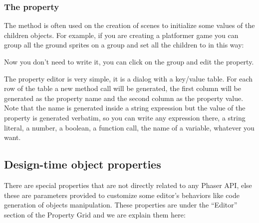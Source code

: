 \documentclass[letterpaper,10pt,english]{sphinxmanual}
\begin{document}
\subsubsection{The  property}
\label{\detokenize{canvas:the-setall-property}}
The  method is often used on the creation of scenes to initialize some values of the children objects. For example, if you are creating a platformer game you can group all the ground sprites on a group and set all the children to  in this way:

\begin{sphinxVerbatim}[commandchars=\\\{\}]
 
\end{sphinxVerbatim}

Now you don’t need to write it, you can click on the  group and edit the  property.

The  property editor is very simple, it is a dialog with a key/value table. For each row of the table a new  method call will be generated, the first column will be generated as the property name and the second column as the property value. Note that the name is generated inside a string expression  but the value of the property is generated verbatim, so you can write any expression there, a string literal, a number, a boolean, a function call, the name of a variable, whatever you want.

\noindent{}


\subsection{Design-time object properties}
\label{\detokenize{canvas:design-time-object-properties}}
There are special properties that are not directly related to any Phaser API, else these are parameters provided to customize some editor’s behaviors like code generation of objects manipulation. These properties are under the “Editor” section of the Property Grid and we are explain them here:
\end{document}
